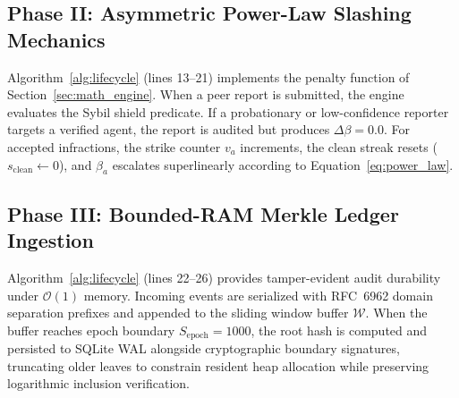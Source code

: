 \documentclass[manuscript, screen, review]{jair}
\begin{document}
\subsection{Phase II: Asymmetric Power-Law Slashing Mechanics}
Algorithm~\ref{alg:lifecycle} (lines 13--21) implements the penalty function of Section~\ref{sec:math_engine}. When a peer report is submitted, the engine evaluates the Sybil shield predicate. If a probationary or low-confidence reporter targets a verified agent, the report is audited but produces $\Delta\beta = 0.0$. For accepted infractions, the strike counter $v_a$ increments, the clean streak resets ($s_{\text{clean}} \leftarrow 0$), and $\beta_a$ escalates superlinearly according to Equation~\eqref{eq:power_law}.

\subsection{Phase III: Bounded-RAM Merkle Ledger Ingestion}
Algorithm~\ref{alg:lifecycle} (lines 22--26) provides tamper-evident audit durability under $\mathcal{O}(1)$ memory. Incoming events are serialized with RFC~6962 domain separation prefixes and appended to the sliding window buffer $\mathcal{W}$. When the buffer reaches epoch boundary $S_{\text{epoch}} = 1000$, the root hash is computed and persisted to SQLite WAL alongside cryptographic boundary signatures, truncating older leaves to constrain resident heap allocation while preserving logarithmic inclusion verification.
\end{document}
